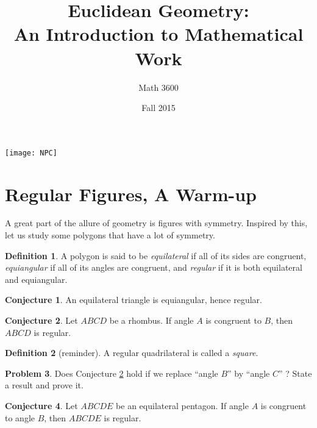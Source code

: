 \documentclass{tufte-handout}
\title{Euclidean Geometry:\\An Introduction to Mathematical Work}
\author[Math 3600]{Math 3600}
\date{Fall 2015}
\theoremstyle{definition}
\newtheorem{problem}{Problem}[section]
\newtheorem{conjecture}[problem]{Conjecture}
\newtheorem*{definition}{Definition}
\begin{document}
\maketitle

\begin{marginfigure}
    \texttt{[image: NPC]}
\end{marginfigure}

\setcounter{section}{6}
\section{Regular Figures, A Warm-up}

A great part of the allure of geometry is figures with symmetry. Inspired by this, let us study some polygons that have a lot of symmetry.

\begin{definition}\label{defn:regular}
A polygon is said to be \emph{equilateral} if all of its sides are congruent, \emph{equiangular} if all of its angles are congruent, and \emph{regular} if it is both equilateral and equiangular.
\end{definition}

\begin{conjecture}\label{conj:equilateral-triangle}
An equilateral triangle is equiangular, hence regular.
\end{conjecture}

\begin{conjecture}\label{conj:regular-rhombus}
Let $ABCD$ be a rhombus. If angle $A$ is congruent to $B$, then $ABCD$ is regular.
\end{conjecture}

\begin{definition}[reminder]\label{defn:square}
A regular quadrilateral is called a \emph{square}.
\end{definition}


\begin{problem}\label{prob:equilateral-quad}
Does Conjecture \ref{conj:regular-rhombus} hold if we replace ``angle $B$'' by ``angle $C$'' ? State a result and prove it.
\end{problem}

\begin{conjecture}\label{conj:equilateral-pentagon}
Let $ABCDE$ be an equilateral pentagon. If angle $A$ is congruent to angle $B$, then $ABCDE$ is regular.
\end{conjecture}
\end{document}
